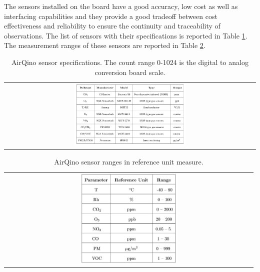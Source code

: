 \documentclass[journal]{IEEEtran}
\begin{document}
The sensors installed on the board have a good accuracy, low cost as well as interfacing capabilities and they provide a good tradeoff between cost effectiveness and reliability to ensure the continuity and traceability of observations. The list of sensors with their specifications is reported in Table  \ref{tab:board_specifications}.
The measurement ranges of these sensors are reported in Table \ref{tab:board_range}.
\begin{table}[tbp]
 \centering
 \begin{center}  
  \begin{tabular}{c}
      \includegraphics[width=0.45\textwidth]{figure/fig_sensor_spec.jpg} 
  \end{tabular}
\end{center}  
\caption{AirQino sensor specifications. The count range 0-1024 is the digital to analog conversion board scale.}
  \label{tab:board_specifications}
\end{table}
\begin{table}[tbp]
 \centering
 \begin{center}  
  \begin{tabular}{c}
      \includegraphics[width=0.4\textwidth]{figure/fig_sensor_range.jpg} 
  \end{tabular}
\end{center}  
\caption{AirQino sensor ranges in reference unit measure.}
  \label{tab:board_range}
\end{table}
\end{document}

